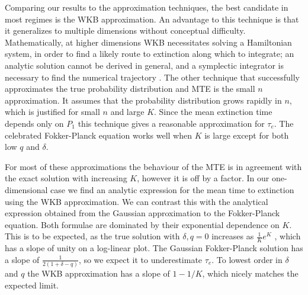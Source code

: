Comparing our results to the approximation techniques, the best candidate in most regimes is the WKB approximation.
An advantage to this technique is that it generalizes to multiple dimensions without conceptual difficulty.
Mathematically, at higher dimensions WKB necessitates solving a Hamiltonian system, in order to find a likely route to extinction along which to integrate; an analytic solution cannot be derived in general, and a symplectic integrator is necessary to find the numerical trajectory \cite{Channell1990}.
The other technique that successfully approximates the true probability distribution and MTE is the small $n$ approximation. 
It assumes that the probability distribution grows rapidly in $n$, which is justified for small $n$ and large $K$.
Since the mean extinction time depends only on $P_1$ this technique gives a reasonable approximation for $\tau_e$. 
The celebrated Fokker-Planck equation works well when $K$ is large except for both low $q$ and $\delta$. 

For most of these approximations the behaviour of the MTE is in agreement with the exact solution with increasing $K$, however it is off by a factor.
In our one-dimensional case we find an analytic expression for the mean time to extinction using the WKB approximation.
We can contrast this with the analytical expression obtained from the Gaussian approximation to the Fokker-Planck equation. 
Both formulae are dominated by their exponential dependence on $K$.
This is to be expected, as the true solution with $\delta,q = 0$ increases as $\frac{1}{K}e^K$ \cite{Lande1993}, which has a slope of unity on a log-linear plot. 
The Gaussian Fokker-Planck solution has a slope of $\frac{1}{2(1+\delta-q)}$, so we expect it to underestimate $\tau_e$. 
To lowest order in $\delta$ and $q$ the WKB approximation has a slope of $1-1/K$, which nicely matches the expected limit.

